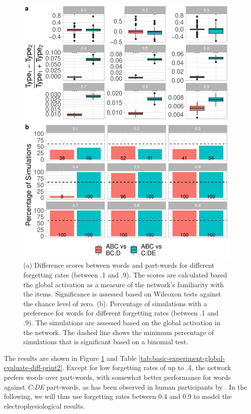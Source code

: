 \documentclass[
]{article}
\begin{document}
\begin{figure}
\includegraphics[width=1\linewidth]{tp_model_entrainment_files/figure-latex/basic-experiment-global-create-plot-combined-fw-plot-1} \caption{(a) Difference scores between words and part-words for different forgetting rates (between .1 and .9). The scores are calculated based the global activation as a measure of the network's familiarity with the items. Significance is assessed based on Wilcoxon tests against the chance level of zero. (b). Percentage of simulations with a preference for words for different forgetting rates (between .1 and .9). The simulations are assessed based on the global activation in the network. The dashed line shows the minimum percentage of simulations that is significant based on a binomial test.}\label{fig:basic-experiment-global-create-plot-combined-fw-plot}
\end{figure}

The results are shown in Figure
\ref{fig:basic-experiment-global-create-plot-combined-fw-plot} and Table
\ref{tab:basic-experiment-global-evaluate-diff-print2}. Except for low
forgetting rates of up to .4, the network prefers words over part-words,
with somewhat better performance for words against \emph{C:DE}
part-words, as has been observed in human participants by
\citep{Fiser2002}. In the following, we will thus use forgetting rates
between 0.4 and 0.9 to model the electrophysiological results.
\end{document}
